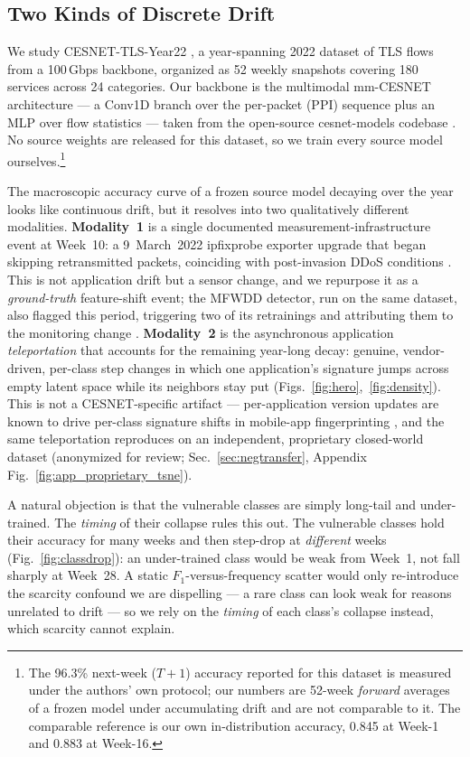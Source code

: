 \subsection{Two Kinds of Discrete Drift}
\label{sec:modalities}
We study CESNET-TLS-Year22 \cite{hynek2024cesnet}, a year-spanning 2022 dataset
of TLS flows from a 100\,Gbps backbone, organized as 52 weekly snapshots
covering 180 services across 24 categories. Our backbone is the multimodal
mm-CESNET architecture --- a Conv1D branch over the per-packet (PPI) sequence
plus an MLP over flow statistics --- taken from the open-source cesnet-models
codebase \cite{luxemburk2023tls}. No source weights are released for this
dataset, so we train every source model ourselves.\footnote{The 96.3\%
next-week ($T{+}1$) accuracy reported for this dataset \cite{hynek2024cesnet} is
measured under the authors' own protocol; our numbers are 52-week
\emph{forward} averages of a frozen model under accumulating drift and are not
comparable to it. The comparable reference is our own in-distribution
accuracy, 0.845 at Week-1 and 0.883 at Week-16.}

The macroscopic accuracy curve of a frozen source model decaying over the year
looks like continuous drift, but it resolves into two qualitatively different
modalities. \textbf{Modality~1} is a single documented measurement-infrastructure
event at Week~10: a 9~March~2022 ipfixprobe exporter upgrade that began skipping
retransmitted packets, coinciding with post-invasion DDoS conditions
\cite{hynek2024cesnet}. This is not application drift but a sensor change, and we
repurpose it as a \emph{ground-truth} feature-shift event; the MFWDD detector, run on
the same dataset, also flagged this period, triggering two of its retrainings and
attributing them to the monitoring change \cite{mfwdd2024}. \textbf{Modality~2} is
the asynchronous application \emph{teleportation} that accounts for the remaining
year-long decay: genuine,
vendor-driven, per-class step changes in which one application's signature jumps
across empty latent space while its neighbors stay put
(Figs.~\ref{fig:hero},~\ref{fig:density}). This is not a CESNET-specific artifact
--- per-application version updates are known to drive per-class signature shifts
in mobile-app fingerprinting \cite{jiang2022fgnet}, and the same teleportation
reproduces on an independent, proprietary closed-world dataset (anonymized for
review; Sec.~\ref{sec:negtransfer}, Appendix
Fig.~\ref{fig:app_proprietary_tsne}).

A natural objection is that the vulnerable classes are simply long-tail and
under-trained. The \emph{timing} of their collapse rules this out. The
vulnerable classes hold their accuracy for many weeks and then step-drop at
\emph{different} weeks (Fig.~\ref{fig:classdrop}): an under-trained class would
be weak from Week~1, not fall sharply at Week~28. A static
$F_1$-versus-frequency scatter would only re-introduce the scarcity confound we
are dispelling --- a rare class can look weak for reasons unrelated to drift ---
so we rely on the \emph{timing} of each class's collapse instead, which scarcity
cannot explain.

